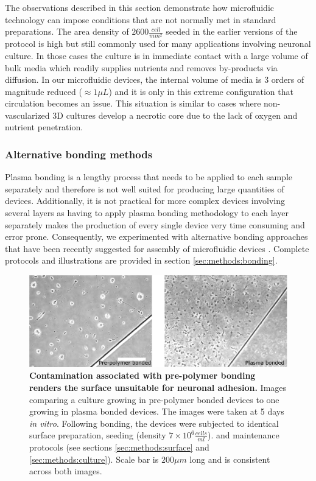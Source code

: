         The observations described in this section demonstrate how microfluidic technology can impose conditions that are not normally met in standard preparations. The area density of \(2600 \frac{cell}{mm^2}\) seeded in the earlier versions of the protocol is high but still commonly used for many applications involving neuronal culture. In those cases the culture is in immediate contact with a large volume of bulk media which readily supplies nutrients and removes by-products via diffusion. In our microfluidic devices, the internal volume of media is 3 orders of magnitude reduced (\(\approx 1 \mu L\)) and it is only in this extreme configuration that circulation becomes an issue. This situation is similar to cases where non-vascularized 3D cultures develop a necrotic core due to the lack of oxygen and nutrient penetration.

        \subsubsection{Alternative bonding methods}
        \label{sec:devices:bonding}
        Plasma bonding is a lengthy process that needs to be applied to each sample separately and therefore is not well suited for producing large quantities of devices. Additionally, it is not practical for more complex devices involving several layers as having to apply plasma bonding methodology to each layer separately makes the production of every single device very time consuming and error prone. Consequently, we experimented with alternative bonding approaches that have been recently suggested for assembly of microfluidic devices \cite{samel2007fabrication,nath2010rapid}. Complete protocols and illustrations are provided in section \ref{sec:methods:bonding}.

         \begin{figure}[h]
            \centering
            \includegraphics[width=15cm]{chapter4/figures/glueBonding/glueBondingComp.jpg}
            \caption[Effect of the pre-polymer bonding approach on the development of neuronal cultures in microfluidic devices]{\textbf{Contamination associated with pre-polymer bonding renders the surface unsuitable for neuronal adhesion.} Images comparing a culture growing in pre-polymer bonded devices to one growing in plasma bonded devices. The images were taken at 5 days \textit{in vitro}. Following bonding, the devices were subjected to identical surface preparation, seeding (density \(7\times10^6 \frac{cells}{ml}\)). and maintenance protocols (see sections \ref{sec:methods:surface} and \ref{sec:methods:culture}). Scale bar is \(200 \mu m\) long and is consistent across both images.}
            \label{fig:devices:glueBonding}
        \end{figure}



